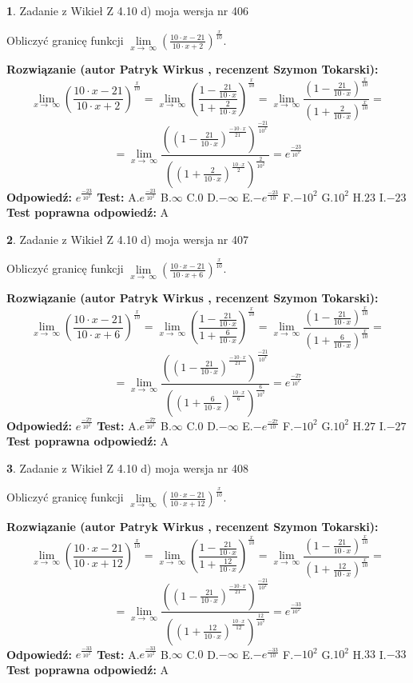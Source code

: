 \documentclass[12pt, a4paper]{article}
\theoremstyle{definition} %
\newtheorem{zad}{}
\newcommand{\zadStart}[1]{\begin{zad}#1\newline}
\newcommand{\zadStop}{\end{zad}}
\newcommand{\rozwStart}[2]{\noindent \textbf{Rozwiązanie (autor #1 , recenzent #2): }\newline}
\newcommand{\rozwStop}{\newline}
\newcommand{\odpStart}{\noindent \textbf{Odpowiedź:}\newline}
\newcommand{\odpStop}{\newline}
\newcommand{\testStart}{\noindent \textbf{Test:}\newline}
\newcommand{\testStop}{\newline}
\newcommand{\kluczStart}{\noindent \textbf{Test poprawna odpowiedź:}\newline}
\newcommand{\kluczStop}{\newline}
\begin{document}
\zadStart{Zadanie z Wikieł Z 4.10 d) moja wersja nr 406}


Obliczyć granicę funkcji  $\lim\limits_{x\to\ \infty}(\frac{10\cdot x-21}{10\cdot x+2})^{\frac{x}{10}}$.
\zadStop
\rozwStart{Patryk Wirkus}{Szymon Tokarski}
$$\lim\limits_{x\to\ \infty}(\frac{10\cdot x-21}{10\cdot x+2})^{\frac{x}{10}} = \lim\limits_{x\to\ \infty}(\frac{1-\frac{21}{10\cdot x}}{1+\frac{2}{10\cdot x}})^{\frac{x}{10}}=\lim\limits_{x\to\ \infty}\frac{(1-\frac{21}{10\cdot x})^{\frac{x}{10}}}{(1+\frac{2}{10\cdot x})^{\frac{x}{10}}}=$$
$$=\lim\limits_{x\to\ \infty}\frac{((1-\frac{21}{10\cdot x})^{\frac{-10\cdot x}{21}})^{\frac{-21}{10^{2}}}}{((1+\frac{2}{10\cdot x})^{\frac{10\cdot x}{2}})^{\frac{2}{10^{2}}}}=e^{\frac{-23}{10^{2}}}$$
\rozwStop
\odpStart
$e^{\frac{-23}{10^{2}}}$
\odpStop
\testStart
A.$e^{\frac{-23}{10^{2}}}$ B.$\infty$ C.$0$ D.$-\infty$ E.$-e^{\frac{-23}{10}}$
F.$-10^{2}$ G.$10^{2}$
H.$23$
I.$-23$
\testStop
\kluczStart
A
\kluczStop



\zadStart{Zadanie z Wikieł Z 4.10 d) moja wersja nr 407}


Obliczyć granicę funkcji  $\lim\limits_{x\to\ \infty}(\frac{10\cdot x-21}{10\cdot x+6})^{\frac{x}{10}}$.
\zadStop
\rozwStart{Patryk Wirkus}{Szymon Tokarski}
$$\lim\limits_{x\to\ \infty}(\frac{10\cdot x-21}{10\cdot x+6})^{\frac{x}{10}} = \lim\limits_{x\to\ \infty}(\frac{1-\frac{21}{10\cdot x}}{1+\frac{6}{10\cdot x}})^{\frac{x}{10}}=\lim\limits_{x\to\ \infty}\frac{(1-\frac{21}{10\cdot x})^{\frac{x}{10}}}{(1+\frac{6}{10\cdot x})^{\frac{x}{10}}}=$$
$$=\lim\limits_{x\to\ \infty}\frac{((1-\frac{21}{10\cdot x})^{\frac{-10\cdot x}{21}})^{\frac{-21}{10^{2}}}}{((1+\frac{6}{10\cdot x})^{\frac{10\cdot x}{6}})^{\frac{6}{10^{2}}}}=e^{\frac{-27}{10^{2}}}$$
\rozwStop
\odpStart
$e^{\frac{-27}{10^{2}}}$
\odpStop
\testStart
A.$e^{\frac{-27}{10^{2}}}$ B.$\infty$ C.$0$ D.$-\infty$ E.$-e^{\frac{-27}{10}}$
F.$-10^{2}$ G.$10^{2}$
H.$27$
I.$-27$
\testStop
\kluczStart
A
\kluczStop



\zadStart{Zadanie z Wikieł Z 4.10 d) moja wersja nr 408}


Obliczyć granicę funkcji  $\lim\limits_{x\to\ \infty}(\frac{10\cdot x-21}{10\cdot x+12})^{\frac{x}{10}}$.
\zadStop
\rozwStart{Patryk Wirkus}{Szymon Tokarski}
$$\lim\limits_{x\to\ \infty}(\frac{10\cdot x-21}{10\cdot x+12})^{\frac{x}{10}} = \lim\limits_{x\to\ \infty}(\frac{1-\frac{21}{10\cdot x}}{1+\frac{12}{10\cdot x}})^{\frac{x}{10}}=\lim\limits_{x\to\ \infty}\frac{(1-\frac{21}{10\cdot x})^{\frac{x}{10}}}{(1+\frac{12}{10\cdot x})^{\frac{x}{10}}}=$$
$$=\lim\limits_{x\to\ \infty}\frac{((1-\frac{21}{10\cdot x})^{\frac{-10\cdot x}{21}})^{\frac{-21}{10^{2}}}}{((1+\frac{12}{10\cdot x})^{\frac{10\cdot x}{12}})^{\frac{12}{10^{2}}}}=e^{\frac{-33}{10^{2}}}$$
\rozwStop
\odpStart
$e^{\frac{-33}{10^{2}}}$
\odpStop
\testStart
A.$e^{\frac{-33}{10^{2}}}$ B.$\infty$ C.$0$ D.$-\infty$ E.$-e^{\frac{-33}{10}}$
F.$-10^{2}$ G.$10^{2}$
H.$33$
I.$-33$
\testStop
\kluczStart
A
\kluczStop
\end{document}
